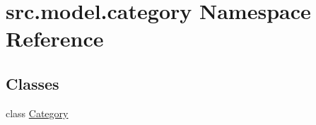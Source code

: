 \hypertarget{namespacesrc_1_1model_1_1category}{}\section{src.\+model.\+category Namespace Reference}
\label{namespacesrc_1_1model_1_1category}
\subsection*{Classes}
\begin{DoxyCompactItemize}
\item 
class \hyperlink{classsrc_1_1model_1_1category_1_1Category}{Category}
\end{DoxyCompactItemize}
